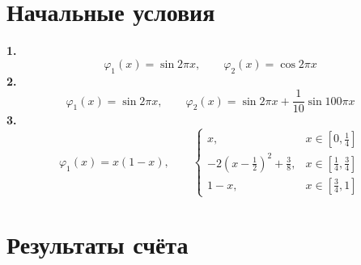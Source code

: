 \documentclass[titlepage]{article}
\def\l{\left}
\def\r{\right}
\begin{document}
\section{Начальные условия}
\indent \textbf{1. }
	$$\varphi_1(x) = \sin{2 \pi x}, \qquad \varphi_2(x) = \cos{2 \pi x}$$
\indent \textbf{2. }
	$$\varphi_1(x) = \sin{2 \pi x}, \qquad \varphi_2(x) = \sin{2 \pi x} + \frac{1}{10}\sin{100 \pi x}$$
\indent \textbf{3. }
	$$\varphi_1(x) = x(1-x), \qquad 
	\begin{cases}
		x, & x \in \l[0, \frac{1}{4}\r] \\
		-2\l(x-\frac{1}{2}\r)^2 + \frac{3}{8}, & x \in \l[\frac{1}{4}, \frac{3}{4}\r] \\
		1-x, & x \in \l[\frac{3}{4}, 1\r]
	\end{cases}$$
\newpage

\section{Результаты счёта}
\end{document}
